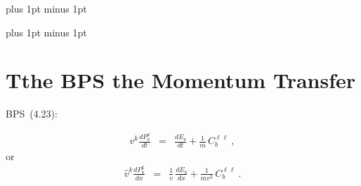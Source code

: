 \documentclass[preprint,12pt,eqsecnum,nofootinbib,amsmath,amssymb]{revtex4}
\newcommand{\bodyskip}{\baselineskip 18pt plus 1pt minus 1pt}
\newcommand{\tableofcontentsskip}{\baselineskip 14pt plus 1pt minus 1pt}
\begin{document}
\pagebreak
\tableofcontentsskip
\tableofcontents

\newpage
\bodyskip

\pagebreak
\clearpage

\section{Tthe BPS the Momentum Transfer}

BPS~(4.23):

\begin{eqnarray}
  v^k \frac{dP_b^k}{dt}
  &=&  
  \frac{dE_b}{dt} + \frac{1}{m}\, C_b^{\ell \ell}
  \ ,
\end{eqnarray}
or
\begin{eqnarray}
  \hat v^k \frac{dP_b^k}{dx}
  &=&  
  \frac{1}{v}\,\frac{dE_b}{dx} + \frac{1}{m v^2 }\, C_b^{\ell \ell}
  \ .
\end{eqnarray}





\end{document}

